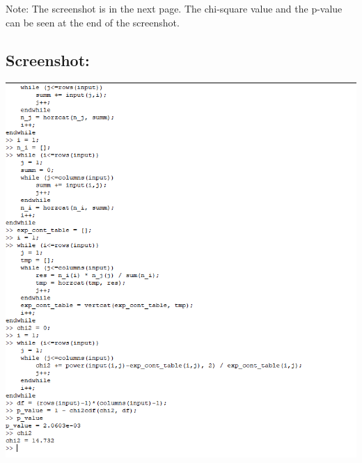 \documentclass{article}
\begin{document}
\vspace{3cm}
Note: The screenshot is in the next page. The chi-square value and the p-value can be seen at the end of the screenshot.

\subsection*{Screenshot:}
\includegraphics[width=1.5\textwidth]{code.png} 
\end{document}
